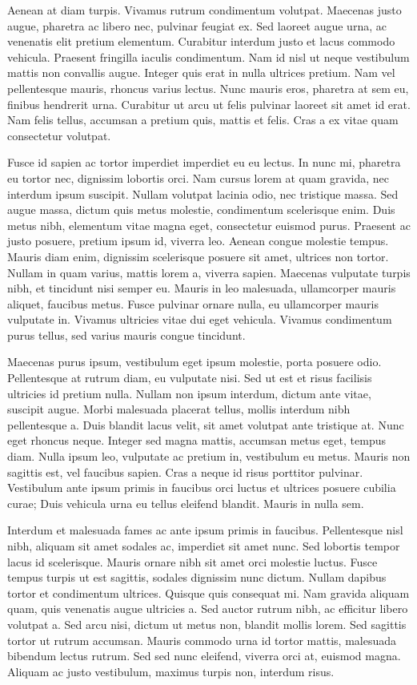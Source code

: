 Aenean at diam turpis. Vivamus rutrum condimentum volutpat. Maecenas justo
augue, pharetra ac libero nec, pulvinar feugiat ex. Sed laoreet augue urna, ac
venenatis elit pretium elementum. Curabitur interdum justo et lacus commodo
vehicula. Praesent fringilla iaculis condimentum. Nam id nisl ut neque
vestibulum mattis non convallis augue. Integer quis erat in nulla ultrices
pretium. Nam vel pellentesque mauris, rhoncus varius lectus. Nunc mauris eros,
pharetra at sem eu, finibus hendrerit urna. Curabitur ut arcu ut felis pulvinar
laoreet sit amet id erat. Nam felis tellus, accumsan a pretium quis, mattis et
felis. Cras a ex vitae quam consectetur volutpat.

Fusce id sapien ac tortor imperdiet imperdiet eu eu lectus. In nunc mi,
pharetra eu tortor nec, dignissim lobortis orci. Nam cursus lorem at quam
gravida, nec interdum ipsum suscipit. Nullam volutpat lacinia odio, nec
tristique massa. Sed augue massa, dictum quis metus molestie, condimentum
scelerisque enim. Duis metus nibh, elementum vitae magna eget, consectetur
euismod purus. Praesent ac justo posuere, pretium ipsum id, viverra leo. Aenean
congue molestie tempus. Mauris diam enim, dignissim scelerisque posuere sit
amet, ultrices non tortor. Nullam in quam varius, mattis lorem a, viverra
sapien. Maecenas vulputate turpis nibh, et tincidunt nisi semper eu. Mauris in
leo malesuada, ullamcorper mauris aliquet, faucibus metus. Fusce pulvinar
ornare nulla, eu ullamcorper mauris vulputate in. Vivamus ultricies vitae dui
eget vehicula. Vivamus condimentum purus tellus, sed varius mauris congue
tincidunt.

Maecenas purus ipsum, vestibulum eget ipsum molestie, porta posuere odio.
Pellentesque at rutrum diam, eu vulputate nisi. Sed ut est et risus facilisis
ultricies id pretium nulla. Nullam non ipsum interdum, dictum ante vitae,
suscipit augue. Morbi malesuada placerat tellus, mollis interdum nibh
pellentesque a. Duis blandit lacus velit, sit amet volutpat ante tristique at.
Nunc eget rhoncus neque. Integer sed magna mattis, accumsan metus eget, tempus
diam. Nulla ipsum leo, vulputate ac pretium in, vestibulum eu metus. Mauris non
sagittis est, vel faucibus sapien. Cras a neque id risus porttitor pulvinar.
Vestibulum ante ipsum primis in faucibus orci luctus et ultrices posuere
cubilia curae; Duis vehicula urna eu tellus eleifend blandit. Mauris in nulla
sem.

Interdum et malesuada fames ac ante ipsum primis in faucibus. Pellentesque nisl
nibh, aliquam sit amet sodales ac, imperdiet sit amet nunc. Sed lobortis tempor
lacus id scelerisque. Mauris ornare nibh sit amet orci molestie luctus. Fusce
tempus turpis ut est sagittis, sodales dignissim nunc dictum. Nullam dapibus
tortor et condimentum ultrices. Quisque quis consequat mi. Nam gravida aliquam
quam, quis venenatis augue ultricies a. Sed auctor rutrum nibh, ac efficitur
libero volutpat a. Sed arcu nisi, dictum ut metus non, blandit mollis lorem.
Sed sagittis tortor ut rutrum accumsan. Mauris commodo urna id tortor mattis,
malesuada bibendum lectus rutrum. Sed sed nunc eleifend, viverra orci at,
euismod magna. Aliquam ac justo vestibulum, maximus turpis non, interdum risus.

